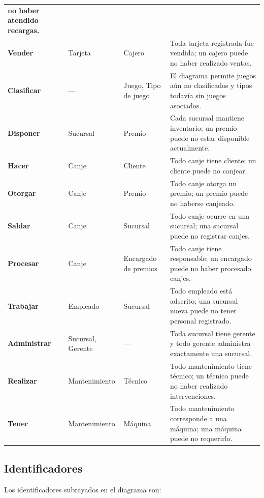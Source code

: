 \begin{center}
\begin{tabularx}{\textwidth}{@{}>{\bfseries\color{unamblue}}p{}p{}p{}X@{}}
no haber atendido recargas. \\
Vender & Tarjeta & Cajero & Toda tarjeta registrada fue vendida; un cajero
puede no haber realizado ventas. \\
Clasificar & --- & Juego, Tipo de juego & El diagrama permite juegos aún no
clasificados y tipos todavía sin juegos asociados. \\
Disponer & Sucursal & Premio & Cada sucursal mantiene inventario; un premio
puede no estar disponible actualmente. \\
Hacer & Canje & Cliente & Todo canje tiene cliente; un cliente puede no canjear. \\
Otorgar & Canje & Premio & Todo canje otorga un premio; un premio puede no
haberse canjeado. \\
Saldar & Canje & Sucursal & Todo canje ocurre en una sucursal; una sucursal
puede no registrar canjes. \\
Procesar & Canje & Encargado de premios & Todo canje tiene responsable; un
encargado puede no haber procesado canjes. \\
Trabajar & Empleado & Sucursal & Todo empleado está adscrito; una sucursal
nueva puede no tener personal registrado. \\
Administrar & Sucursal, Gerente & --- & Toda sucursal tiene gerente y todo
gerente administra exactamente una sucursal. \\
Realizar & Mantenimiento & Técnico & Todo mantenimiento tiene técnico; un
técnico puede no haber realizado intervenciones. \\
Tener & Mantenimiento & Máquina & Todo mantenimiento corresponde a una
máquina; una máquina puede no requerirlo. \\
\bottomrule
\end{tabularx}
\end{center}

\subsection{Identificadores}

Los identificadores subrayados en el diagrama son:


